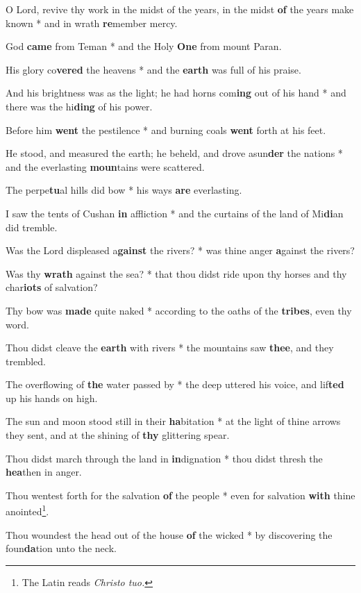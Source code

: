 \begin{multicols}{2}
	O Lord, revive thy work in the midst of the years, in the midst \textbf{of} the years make known * and in wrath \textbf{re}member mercy.
	
	God \textbf{came} from Teman * and the Holy \textbf{One} from mount Paran.
	
	His glory co\textbf{vered} the heavens * and the \textbf{earth} was full of his praise.
	
	And his brightness was as the light; he had horns com\textbf{ing} out of his hand * and there was the hi\textbf{ding} of his power.
	
	Before him \textbf{went} the pestilence * and burning coals \textbf{went} forth at his feet.
	
	He stood, and measured the earth; he beheld, and drove asun\textbf{der} the nations * and the everlasting \textbf{moun}tains were scattered.
	
	The perpe\textbf{tu}al hills did bow * his ways \textbf{are} everlasting.
	
	I saw the tents of Cushan \textbf{in} affliction * and the curtains of the land of Mi\textbf{di}an did tremble.
	
	Was the Lord displeased a\textbf{gainst} the rivers? * was thine anger \textbf{a}gainst the rivers?
	
	Was thy \textbf{wrath} against the sea? * that thou didst ride upon thy horses and thy char\textbf{iots} of salvation?
	
	Thy bow was \textbf{made} quite naked * according to the oaths of the \textbf{tribes}, even thy word.
	
	Thou didst cleave the \textbf{earth} with rivers * the mountains saw \textbf{thee}, and they trembled.
	
	The overflowing of \textbf{the} water passed by * the deep uttered his voice, and lif\textbf{ted} up his hands on high.
	
	The sun and moon stood still in their \textbf{ha}bitation * at the light of thine arrows they sent, and at the shining of \textbf{thy} glittering spear.
	
	Thou didst march through the land in \textbf{in}dignation * thou didst thresh the \textbf{hea}then in anger.
	
	Thou wentest forth for the salvation \textbf{of} the people * even for salvation \textbf{with} thine anointed\footnote{The Latin reads \textit{Christo tuo.}}.
	
	Thou woundest the head out of the house \textbf{of} the wicked * by discovering the foun\textbf{da}tion unto the neck.
	

\end{multicols}
